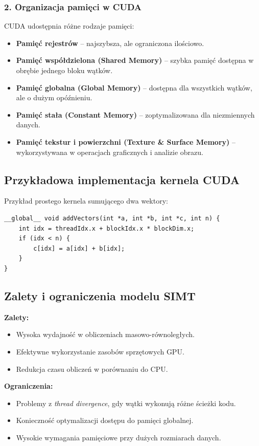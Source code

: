\subsubsection{2. Organizacja pamięci w CUDA}
CUDA udostępnia różne rodzaje pamięci:
\begin{itemize}
    \item \textbf{Pamięć rejestrów} – najszybsza, ale ograniczona ilościowo.
    \item \textbf{Pamięć współdzielona (Shared Memory)} – szybka pamięć dostępna w obrębie jednego bloku wątków.
    \item \textbf{Pamięć globalna (Global Memory)} – dostępna dla wszystkich wątków, ale o dużym opóźnieniu.
    \item \textbf{Pamięć stała (Constant Memory)} – zoptymalizowana dla niezmiennych danych.
    \item \textbf{Pamięć tekstur i powierzchni (Texture \& Surface Memory)} – wykorzystywana w operacjach graficznych i analizie obrazu.
\end{itemize}

\subsection{Przykładowa implementacja kernela CUDA}
Przykład prostego kernela sumującego dwa wektory:
\begin{verbatim}
__global__ void addVectors(int *a, int *b, int *c, int n) {
    int idx = threadIdx.x + blockIdx.x * blockDim.x;
    if (idx < n) {
        c[idx] = a[idx] + b[idx];
    }
}
\end{verbatim}

\subsection{Zalety i ograniczenia modelu SIMT}

\textbf{Zalety:}
\begin{itemize}
    \item Wysoka wydajność w obliczeniach masowo-równoległych.
    \item Efektywne wykorzystanie zasobów sprzętowych GPU.
    \item Redukcja czasu obliczeń w porównaniu do CPU.
\end{itemize}

\textbf{Ograniczenia:}
\begin{itemize}
    \item Problemy z \textit{thread divergence}, gdy wątki wykonują różne ścieżki kodu.
    \item Konieczność optymalizacji dostępu do pamięci globalnej.
    \item Wysokie wymagania pamięciowe przy dużych rozmiarach danych.
\end{itemize}

